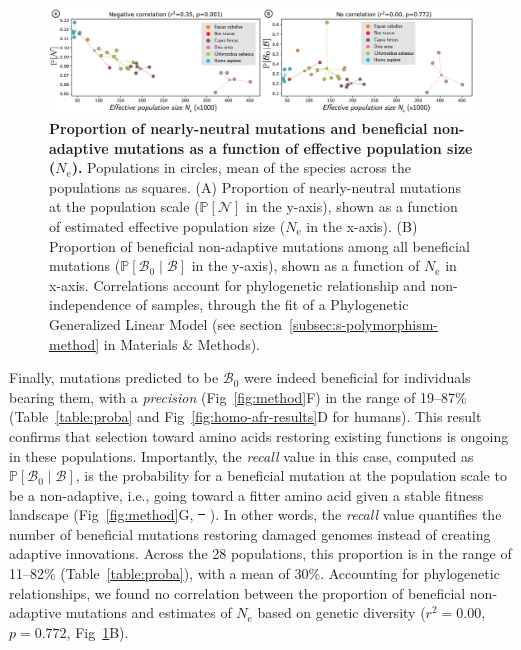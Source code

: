 \documentclass[10pt,letterpaper]{article}
\newcommand{\Ne}{N_{\text{e}}}
\newcommand{\proba}{\mathbb{P}}
\newcommand{\SphyBen}{\mathcal{B}_0}
\newcommand{\given}{\mid}
\newcommand{\SpopNeu}{\mathcal{N}}
\newcommand{\SpopBen}{\mathcal{B}}
\providecommand{\DIFaddtex}[1]{{\protect\color{blue}\uwave{#1}}} %
\providecommand{\DIFdeltex}[1]{{\protect\color{red}\sout{#1}}}                      %
\providecommand{\DIFaddbegin}{} %
\providecommand{\DIFaddend}{} %
\providecommand{\DIFdelbegin}{} %
\providecommand{\DIFdelend}{} %
\providecommand{\DIFadd}[1]{\texorpdfstring{\DIFaddtex{#1}}{#1}} %
\providecommand{\DIFdel}[1]{\texorpdfstring{\DIFdeltex{#1}}{}} %
\newcommand{\DIFscaledelfig}{0.5}
\newlength{\DIFdelgraphicswidth} %
\newlength{\DIFdelgraphicsheight} %
\newcommand{\DIFaddincludegraphics}[2][]{{\color{blue}\fbox{\DIFOincludegraphics[#1]{#2}}}} %
\newcommand{\DIFdelincludegraphics}[2][]{%
\sbox{\DIFdelgraphicsbox}{\DIFOincludegraphics[#1]{#2}}%
\settoboxwidth{\DIFdelgraphicswidth}{\DIFdelgraphicsbox} %
\settoboxtotalheight{\DIFdelgraphicsheight}{\DIFdelgraphicsbox} %
\scalebox{\DIFscaledelfig}{%
\parbox[b]{\DIFdelgraphicswidth}{\usebox{\DIFdelgraphicsbox}\\[-\baselineskip] \rule{\DIFdelgraphicswidth}{0em}}\llap{\resizebox{\DIFdelgraphicswidth}{\DIFdelgraphicsheight}{%
\setlength{\unitlength}{\DIFdelgraphicswidth}%
\begin{picture}(1,1)%
\thicklines\linethickness{2pt} %
{\color[rgb]{1,0,0}\put(0,0){\framebox(1,1){}}}%
{\color[rgb]{1,0,0}\put(0,0){\line( 1,1){1}}}%
{\color[rgb]{1,0,0}\put(0,1){\line(1,-1){1}}}%
\end{picture}%
}\hspace*{3pt}}} %
} %
\DeclareRobustCommand{\DIFaddbegin}{\DIFOaddbegin \let\includegraphics\DIFaddincludegraphics} %
\DeclareRobustCommand{\DIFaddend}{\DIFOaddend \let\includegraphics\DIFOincludegraphics} %
\DeclareRobustCommand{\DIFdelbegin}{\DIFOdelbegin \let\includegraphics\DIFdelincludegraphics} %
\DeclareRobustCommand{\DIFdelend}{\DIFOaddend \let\includegraphics\DIFOincludegraphics} %
\begin{document}
\begin{figure}[!ht]
\begin{adjustwidth}{-2.25in}{0in} %
\centering
\includegraphics[width=1.4\textwidth, page=1] {figure4.eps}
\caption{
{\bf Proportion of nearly-neutral mutations and beneficial non-adaptive mutations as a function of effective population size ($\Ne$).}
Populations in circles, mean of the species across the populations as squares.
(A) Proportion of nearly-neutral mutations at the population scale ($\proba [ \SpopNeu]$ in the y-axis), shown as a function of estimated effective population size ($\Ne$ in the x-axis).
(B) Proportion of beneficial non-adaptive mutations among all beneficial mutations ($\proba [ \SphyBen \given \SpopBen]$ in the y-axis), shown as a function of $\Ne$ in x-axis.
Correlations account for phylogenetic relationship and non-independence of samples, through the fit of a Phylogenetic Generalized Linear Model (see section~\ref{subsec:s-polymorphism-method} in Materials \& Methods).
}
\label{fig:diversity}
\end{adjustwidth}
\end{figure}

Finally, mutations predicted to be $\SphyBen$ were indeed beneficial for individuals bearing them, with a \textit{precision} (Fig~\ref{fig:method}F) in the range of 19--87\% (Table~\ref{table:proba} and Fig~\ref{fig:homo-afr-results}D for humans).
This result confirms that selection toward amino acids restoring existing functions is ongoing in these populations.
Importantly, the \textit{recall} value in this case, computed as $\proba [ \SphyBen \given \SpopBen]$, is the probability for a beneficial mutation at the population scale to be a non-adaptive, i.e., going toward a fitter amino acid given a stable fitness landscape (Fig~\ref{fig:method}G, \DIFdelbegin \DIFdel{~}%
\DIFdelend \DIFaddbegin \DIFadd{Table~A in~}\DIFaddend ).
In other words, the \textit{recall} value quantifies the number of beneficial mutations restoring damaged genomes instead of creating adaptive innovations.
Across the 28 populations, this proportion is in the range of 11--82\% (Table~\ref{table:proba}), with a mean of 30\%.
Accounting for phylogenetic relationships, we found no correlation between the proportion of beneficial non-adaptive mutations and estimates of $\Ne$ based on genetic diversity ($r^2=0.00$, $p=0.772$, Fig~\ref{fig:diversity}B).
\end{document}
